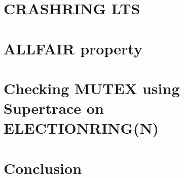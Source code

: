 \documentclass[fleqn]{article}
\begin{document}


\section{CRASHRING LTS}



\section{ALLFAIR property}





\section{Checking MUTEX using Supertrace on ELECTIONRING(N)}


\section{Conclusion}

\end{document}

